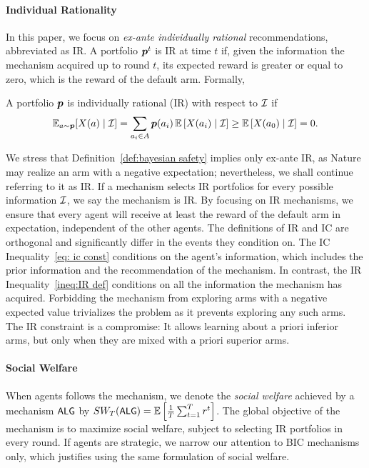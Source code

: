 \paragraph{Individual Rationality}
In this paper, we focus on \textit{ex-ante individually rational} recommendations, abbreviated as IR. A portfolio $\boldsymbol{ p }^t$ is IR at time $t$ if, given the information the mechanism acquired up to round $t$, its expected reward is greater or equal to zero, which is the reward of the default arm. Formally,
\begin{definition}\label{def:bayesian safety}
A portfolio $\boldsymbol{ p }$ is individually rational (IR) with respect to $\mathcal{I}$ if
\begin{equation}\label{ineq:IR def}
\operatorname{\mathbb{E}}_{a\sim \boldsymbol{ p }}[X(a) \mid \mathcal{I}]=\sum_{a_i\in A}\boldsymbol{ p } (a_i)\operatorname{\mathbb{E}}\left[X(a_i)\mid \mathcal{I}\right]\geq \operatorname{\mathbb{E}}\left[X(a_0)\mid \mathcal{I}\right]= 0.
\end{equation}
\end{definition}
We stress that Definition~\ref{def:bayesian safety} implies only ex-ante IR, as Nature may realize an arm with a negative expectation; nevertheless, we shall continue referring to it as IR. If a mechanism selects IR portfolios for every possible information $\mathcal{I}$, we say the mechanism is IR. By focusing on IR mechanisms, we ensure that every agent will receive at least the reward of the default arm in expectation, independent of the other agents. The definitions of IR and IC are orthogonal and significantly differ in the events they condition on. The IC Inequality~\eqref{eq: ic const} conditions on the agent's information, which includes the prior information and the recommendation of the mechanism. In contrast, the IR Inequality~\eqref{ineq:IR def} conditions on all the information the mechanism has acquired. Forbidding the mechanism from exploring arms with a negative expected value trivializes the problem as it prevents exploring any such arms. The IR constraint is a compromise: It allows learning about a priori inferior arms, but only when they are mixed with a priori superior arms.

\paragraph{Social Welfare} When agents follows the mechanism, we denote the \textit{social welfare} achieved by a mechanism ${\small\textnormal{\textsf{ALG}}}$ by $SW_T({\small\textnormal{\textsf{ALG}}})=\operatorname{\mathbb{E}}\left[\frac{1}{T}\sum_{t=1}^T r^t\right]$. The global objective of the mechanism is to maximize social welfare, subject to selecting IR portfolios in every round. If agents are strategic, we narrow our attention to BIC mechanisms only, which justifies using the same formulation of social welfare.

